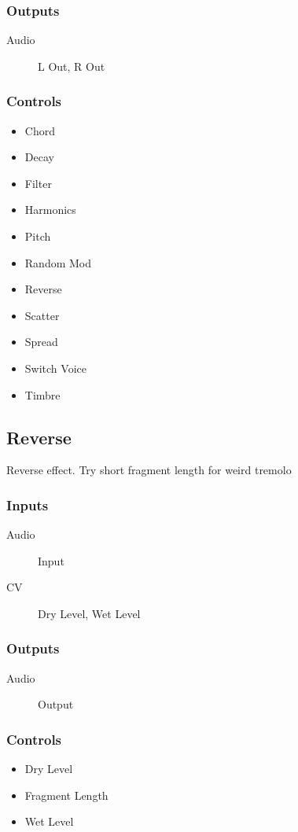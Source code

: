 \subsubsection{Outputs}
\begin{description}
\item [Audio] L Out, R Out
\end{description}

\subsubsection{Controls}
\begin{itemize}
\item Chord
\item Decay
\item Filter
\item Harmonics
\item Pitch
\item Random Mod
\item Reverse
\item Scatter
\item Spread
\item Switch Voice
\item Timbre
\end{itemize}

\subsection{Reverse}

Reverse effect. Try short fragment length for weird tremolo



\subsubsection{Inputs}
\begin{description}
\item [Audio] Input
\item [CV] Dry Level, Wet Level
\end{description}

\subsubsection{Outputs}
\begin{description}
\item [Audio] Output
\end{description}

\subsubsection{Controls}
\begin{itemize}
\item Dry Level
\item Fragment Length
\item Wet Level
\end{itemize}

